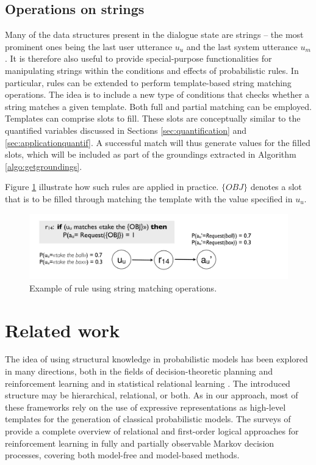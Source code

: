 \subsection{Operations on strings}

Many of the data structures present in the dialogue state are strings -- the most prominent ones being the last user utterance $u_u$ and the last system utterance $u_m$. It is therefore also useful to provide special-purpose functionalities for manipulating strings within the conditions and effects of probabilistic rules. In particular, rules can be extended to perform template-based string matching operations.  The idea is to include a new type of conditions that checks whether a string matches a given template.  Both full and partial matching can be employed. Templates can comprise slots to fill. These slots are conceptually similar to the quantified variables discussed in Sections \ref{sec:quantification} and \ref{sec:applicationquantif}. A successful match will thus generate values for the filled slots, which will be included as part of the groundings extracted in Algorithm \ref{algo:getgroundings}. 

Figure \ref{fig:stringmanip} illustrate how such rules are applied in practice.  $\{OBJ\}$ denotes a slot that is to be filled through matching the template with the value specified in $u_u$. 
\begin{figure}[h]
\centering
\includegraphics[scale=0.25]{imgs/stringmanip.pdf}
\caption{Example of rule using string matching operations.}
\label{fig:stringmanip}
\end{figure}

\section{Related work}
\label{sec:relatedwork}

The idea of using structural knowledge in probabilistic models has been explored in many directions, both in the fields of decision-theoretic planning and reinforcement learning \citep{Hauskrecht98,Pineau2004,KerstingR04,lang10jair,Otterlo2012} and in statistical relational learning \citep{Jaeger01,Richardson:2006,getoor:srlbook07}.  The introduced structure may be hierarchical, relational, or both. As in our approach, most of these frameworks rely on the use of expressive representations as high-level templates for the generation of classical probabilistic models.  The surveys of \cite{Otterlo2006,Otterlo2012} provide a complete overview of relational and first-order logical approaches for reinforcement learning in fully and partially observable Markov decision processes, covering both model-free and model-based methods. 

